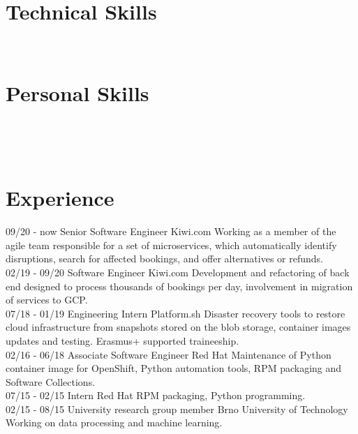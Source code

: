 \documentclass[]{friggeri-cv}
\begin{document}
\begin{aside}
  \section{Technical Skills}
    ~
  \section{Personal Skills}
    ~
\end{aside}
~
\section{Experience}
\begin{entrylist}
  \entry
    {09/20 - now}
    {Senior Software Engineer}
    {Kiwi.com}
    {Working as a member of the agile team responsible for a set of microservices, which automatically identify disruptions, search for affected bookings, and offer alternatives or refunds.\\}
  \entry
    {02/19 - 09/20}
    {Software Engineer}
    {Kiwi.com}
    {Development and refactoring of back end designed to process thousands of bookings per day,
    involvement in migration of services to GCP.\\}
  \entry
    {07/18 - 01/19}
    {Engineering Intern}
    {Platform.sh}
    {Disaster recovery tools to restore cloud infrastructure from snapshots stored on the blob storage,
    container images updates and testing. Erasmus+ supported traineeship.\\}
  \entry
    {02/16 - 06/18}
    {Associate Software Engineer}
    {Red Hat}
    {Maintenance of Python container image for OpenShift, Python automation tools, RPM packaging and
    Software Collections.\\}
  \entry
    {07/15 - 02/15}
    {Intern}
    {Red Hat}
    {RPM packaging, Python programming.\\}
  \entry
    {02/15 - 08/15}
    {University research group member}
    {Brno University of Technology}
    {Working on data processing and machine learning.\\}
\end{entrylist}
~
\end{document}
